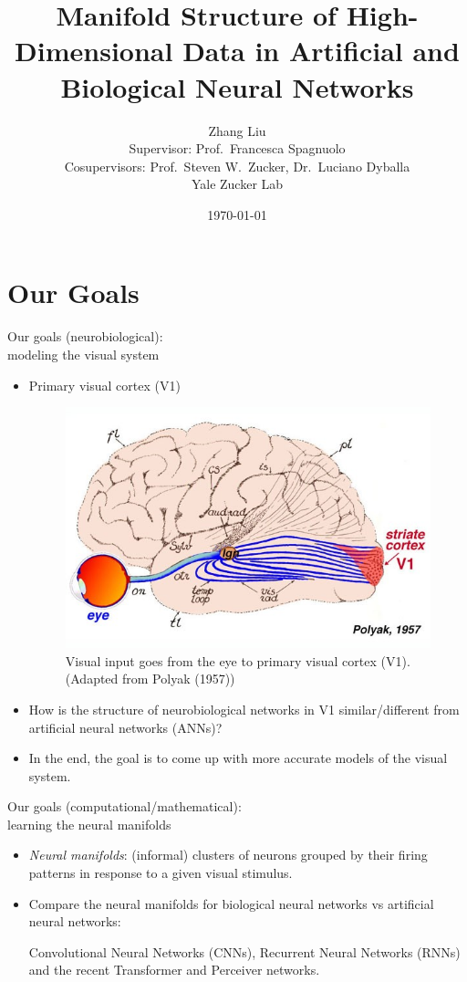 \documentclass[xcolor={dvipsnames,svgnames}]{beamer}
\title{Manifold Structure of High-Dimensional Data in Artificial and Biological Neural Networks}
\author{Zhang Liu\\ Supervisor: Prof.~Francesca Spagnuolo\\Cosupervisors: Prof.~Steven W.~Zucker, Dr.~Luciano Dyballa\\ Yale Zucker Lab}
\date{\today}
\begin{document}
\begin{frame}
\titlepage
\end{frame}

\section{Our Goals}
\begin{frame}{Our goals (neurobiological): \\modeling the visual system}
\begin{itemize}
    \item Primary visual cortex (V1)
    \begin{figure}[H]
            \centering
                \includegraphics[width=0.25
                \textwidth]{figures-models/v1.jpg}
                \caption{Visual input goes from the eye to primary visual cortex (V1).\\ (Adapted from Polyak (1957))}
            \end{figure}     
        \item How is the structure of neurobiological networks in V1 similar/different from artificial neural networks (ANNs)?
        \item  In the end, the goal is to come up with more accurate models of the visual system.
\end{itemize}
\end{frame}
\begin{frame}{Our goals (computational/mathematical): \\learning the neural manifolds}
\begin{itemize}
        \item \textit{Neural manifolds}: (informal) clusters of neurons grouped by their firing patterns in response to a given visual stimulus. 
        \item Compare the neural manifolds for biological neural networks vs artificial neural networks: 
        
        Convolutional Neural Networks (CNNs), Recurrent Neural Networks (RNNs) and the recent Transformer and Perceiver networks.
\end{itemize}
\end{frame}
\end{document}
